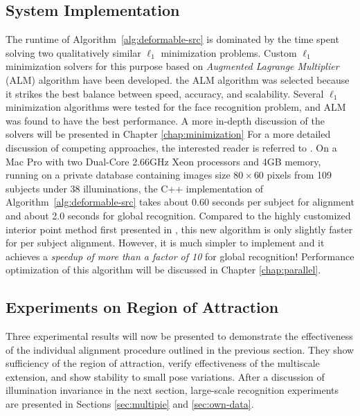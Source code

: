 \subsection{System Implementation}
The runtime of Algorithm~\ref{alg:deformable-src} is dominated
by the time spent solving two qualitatively similar $\ell_1$ minimization problems.
Custom $\ell_1$ minimization solvers for this purpose based on
\emph{Augmented Lagrange Multiplier} (ALM) algorithm have been developed.
the ALM algorithm was selected because it strikes the best
balance between speed, accuracy, and scalability.  Several $\ell_1$ minimization
algorithms were tested for the face recognition problem, 
and ALM was found to have the best performance. 
A more in-depth discussion of the solvers will be presented
in Chapter \ref{chap:minimization}
For a more detailed discussion of competing
approaches, the interested reader is referred to
\cite{YangA2010-pp}.
On a Mac Pro with
two Dual-Core 2.66GHz Xeon processors and 4GB memory,
running on a private database containing images size $80\times 60$
pixels from 109 subjects under 38 illuminations,
the C++ implementation of Algorithm~\ref{alg:deformable-src} takes
about 0.60 seconds per subject for alignment and about 2.0
seconds for global recognition. Compared to the highly
customized interior point method first presented in 
\cite{Wagner2009-CVPR}, this new algorithm is
only slightly faster for per subject alignment. However, it is
much simpler to implement and it achieves a
\emph{speedup of more than a factor of 10} for global
recognition!  Performance optimization of this algorithm
will be discussed in Chapter \ref{chap:parallel}.

\subsection{Experiments on Region of Attraction} Three experimental results
will now be presented to demonstrate the effectiveness of the individual
alignment procedure outlined in the previous section. They show sufficiency of
the region of attraction, verify effectiveness of the multiscale extension, and
show stability to small pose variations.  After a discussion of illumination
invariance in the next section, large-scale recognition experiments are
presented in Sections \ref{sec:multipie} and \ref{sec:own-data}.

